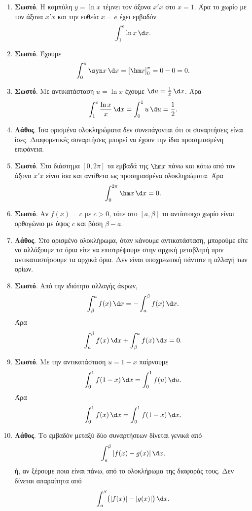 \begin{enumerate}[label=\textbf{3.\arabic*.}]
\item \textbf{Σωστό}. Η καμπύλη $y=\ln x$ τέμνει τον άξονα $x'x$ στο $x=1$. Άρα το χωρίο με τον άξονα $x'x$ και την ευθεία $x=e$ έχει εμβαδόν
\[
\dint_1^e \ln x\,\d x.
\]

\item \textbf{Σωστό}. Έχουμε
\[
\dint_0^\pi \syn x\,\d x
=\left[\hm x\right]_0^\pi
=0-0=0.
\]

\item \textbf{Σωστό}. Με αντικατάσταση $u=\ln x$ έχουμε $\d u=\frac1x\,\d x$. Άρα
\[
\dint_1^e \frac{\ln x}{x}\,\d x
=\dint_0^1 u\,\d u
=\frac12.
\]

\item \textbf{Λάθος}. Ίσα ορισμένα ολοκληρώματα δεν συνεπάγονται ότι οι συναρτήσεις είναι ίσες. Διαφορετικές συναρτήσεις μπορεί να έχουν την ίδια προσημασμένη επιφάνεια.

\item \textbf{Σωστό}. Στο διάστημα $[0,2\pi]$ τα εμβαδά της $\hm x$ πάνω και κάτω από τον άξονα $x'x$ είναι ίσα και αντίθετα ως προσημασμένα ολοκληρώματα. Άρα
\[
\dint_0^{2\pi}\hm x\,\d x=0.
\]

\item \textbf{Σωστό}. Αν $f(x)=c$ με $c>0$, τότε στο $[a,\beta]$ το αντίστοιχο χωρίο είναι ορθογώνιο με ύψος $c$ και βάση $\beta-a$.

\item \textbf{Λάθος}. Στο ορισμένο ολοκλήρωμα, όταν κάνουμε αντικατάσταση, μπορούμε είτε να αλλάξουμε τα όρια είτε να επιστρέψουμε στην αρχική μεταβλητή πριν αντικαταστήσουμε τα αρχικά όρια. Δεν είναι υποχρεωτική πάντοτε η αλλαγή των ορίων.

\item \textbf{Σωστό}. Από την ιδιότητα αλλαγής άκρων,
\[
\dint_\beta^a f(x)\,\d x=-\dint_a^\beta f(x)\,\d x.
\]
Άρα
\[
\dint_a^\beta f(x)\,\d x+\dint_\beta^a f(x)\,\d x=0.
\]

\item \textbf{Σωστό}. Με την αντικατάσταση $u=1-x$ παίρνουμε
\[
\dint_0^1 f(1-x)\,\d x=\dint_0^1 f(u)\,\d u.
\]
Άρα
\[
\dint_0^1 f(x)\,\d x=\dint_0^1 f(1-x)\,\d x.
\]

\item \textbf{Λάθος}. Το εμβαδόν μεταξύ δύο συναρτήσεων δίνεται γενικά από
\[
\dint_a^\beta |f(x)-g(x)|\,\d x,
\]
ή, αν ξέρουμε ποια είναι πάνω, από το ολοκλήρωμα της διαφοράς τους. Δεν δίνεται απαραίτητα από
\[
\dint_a^\beta \bigl(|f(x)|-|g(x)|\bigr)\,\d x.
\]
\end{enumerate}

